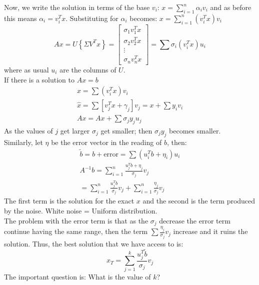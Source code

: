 Now, we write the solution in terms of the base $v_i$: $x=\sum_{i=1}^n \alpha_i v_i$ and as before this means $\alpha_i=v_i^T x$. Substituting for $\alpha_i$ becomes: $x= \sum_{i=1}^n (v_i^T x)v_i$ \\
\begin{equation}
Ax= U\left\{\Sigma V^Tx\right\} = \begin{bmatrix} \sigma_1 v_1^T x \\ \sigma_2 v_2^T x \\ \vdots \\ \sigma_n v_n^T x \end{bmatrix} = \sum \sigma_i(v_i^Tx)u_i
\end{equation}
where as usual $u_i$ are the columns of $U$.\\
If there is a solution to $Ax=b$ 
\begin{gather*}
x=\sum (v_i^T x)v_i \\
\hat x = \sum \left[ v_j^Tx+\gamma_j \right] v_j = x+\sum y_iv_i\\
Ax = Ax + \sum \sigma_j y_j u_j
\end{gather*}
As the values of $j$ get larger $\sigma_j$ get smaller; then $\sigma_j y_j $ becomes smaller.\\
Similarly, let $\eta$ be the error vector in the reading of $b$, then:
\begin{gather*}
\tilde b = b+ \text{error} = \sum(u_i^T b + \eta_i)u_i\\
A ^{-1} b = \sum_{i=1}^n \frac{u_j^T b + \eta_j}{\sigma_j} v_j\\
=  \sum_{i=1}^n \frac{u_j^T b  }{\sigma_j} v_j + \sum_{i=1}^n \frac{ \eta_j}{\sigma_j} v_j
\end{gather*}
The first term is the solution for the exact $x$ and the second is the term produced by the noise.
White noise = Uniform distribution.\\
The problem with the error term is that as the $\sigma_j$ decrease the error term continue having the same range, then the term $\sum \frac{\eta_j}{\sigma_j}v_j $ increase and it ruins the solution. Thus, the best solution that we have access to is:
$$ x_T = \sum_{j=1}^k \frac{u_j^T \tilde b}{\sigma_j} v_j$$
The important question is: What is the value of $k$? 
